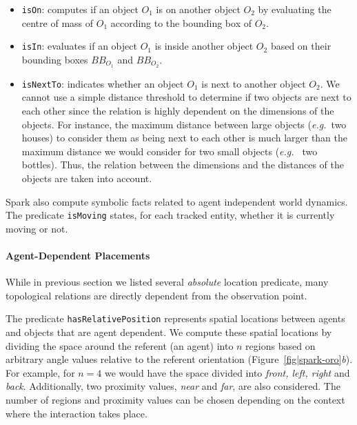 \documentclass[preprint,3p,times]{elsarticle}
\newcommand{\concept}[1]{{\small \texttt{#1}}}
\newcommand{\eg}{{\textit{e.g.\ }}}
\begin{document}
\begin{itemize}
	\item \concept{isOn}: computes if an object $O_1$ is on another object $O_2$ by
	evaluating the centre of mass of $O_1$ according to the bounding box of $O_2$.

	\item \concept{isIn}: evaluates if an object $O_1$ is inside another object
	$O_2$ based on their bounding boxes $BB_{O_1}$ and $BB_{O_2}$.

	\item \concept{isNextTo}: indicates whether an object $O_1$ is next to another
	object $O_2$. We cannot use a simple distance threshold to determine if two
	objects are next to each other since the relation is highly dependent on the
	dimensions of the objects. For instance, the maximum distance between large
	objects (\eg two houses) to consider them as being next to each other is much
	larger than the maximum distance we would consider for two small objects (\eg
	two bottles). Thus, the relation between the dimensions and the distances of
	the objects are taken into account.  

\end{itemize} 

{\sc Spark} also compute symbolic facts related to agent independent world dynamics.
The predicate \concept{isMoving} states, for each tracked entity, whether it is
currently moving or not.


\paragraph{Agent-Dependent Placements}

While in previous section we listed several \emph{absolute} location predicate,
many topological relations are directly dependent from the observation point.

The predicate \concept{hasRelativePosition} represents spatial locations
between agents and objects that are agent dependent.  We compute these spatial
locations by dividing the space around the referent (an agent) into $n$ regions
based on arbitrary angle values relative to the referent orientation
(Figure~\ref{fig|spark-oro}\emph{b}).  For
example, for $n = 4$ we would have the space divided into \emph{front, left,
right} and \emph{back}. Additionally, two proximity values, \emph{near} and
\emph{far}, are also considered. The number of regions and proximity values can
be chosen depending on the context where the interaction takes place.
\end{document}

